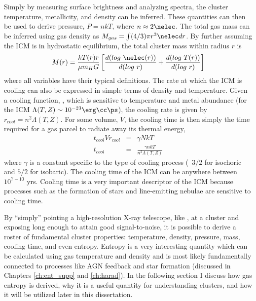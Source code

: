 Simply by measuring surface brightness and analyzing spectra, the
cluster temperature, metallicity, and density can be inferred. These
quantities can then be used to derive pressure, $P = nkT$, where $n
\approx 2\nelec$. The total gas mass can be inferred using gas density
as $M_{gas} = \int (4/3) \pi r^3 \nelec dr$. By further assuming the
ICM is in hydrostatic equilibrium, the total cluster mass within
radius $r$ is
\begin{equation}
M(r) = \frac{kT(r)r}{\mu m_H
G}\left[\frac{d(log~\nelec(r))}{d(log~r)}+\frac{d(log~T(r))}{d(log~r)}\right]
\end{equation}
where all variables have their typical definitions. The rate at which
the ICM is cooling can also be expressed in simple terms of density
and temperature. Given a cooling function,
, which is sensitive to
temperature and metal abundance (for the ICM $\Lambda(T,Z) \sim
10^{-23} \erg \cc \ps$), the cooling rate is given by $r_{cool} = n^2
\Lambda(T,Z)$. For some volume, $V$, the cooling time is then simply
the time required for a gas parcel to radiate away its thermal energy,
\begin{eqnarray}
t_{cool} V r_{cool} &=& \gamma NkT\\
t_{cool} &=& \frac{\gamma nkT}{n^2\Lambda(T,Z)}
\label{eqn:tcool}
\end{eqnarray}
where $\gamma$ is a constant specific to the type of cooling process
(\eg\ $3/2$ for isochoric and $5/2$ for isobaric). The cooling time of
the ICM can be anywhere between $10^{7-10}$ yrs. Cooling time is a
very important descriptor of the ICM because processes such as the
formation of stars and line-emitting nebulae are sensitive to cooling
time.

By ``simply'' pointing a high-resolution X-ray telescope, like
\chandra, at a cluster and exposing long enough to attain good
signal-to-noise, it is possible to derive a roster of fundamental
cluster properties: temperature, density, pressure, mass, cooling
time, and even entropy. Entropy is a very interesting quantity which
can be calculated using gas temperature and density and is most likely
fundamentally connected to processes like AGN feedback and star
formation (discussed in Chapters \ref{ch:ent_supp} and
\ref{ch:harad}). In the following section I discuss how gas entropy is
derived, why it is a useful quantity for understanding clusters, and
how it will be utilized later in this dissertation.

